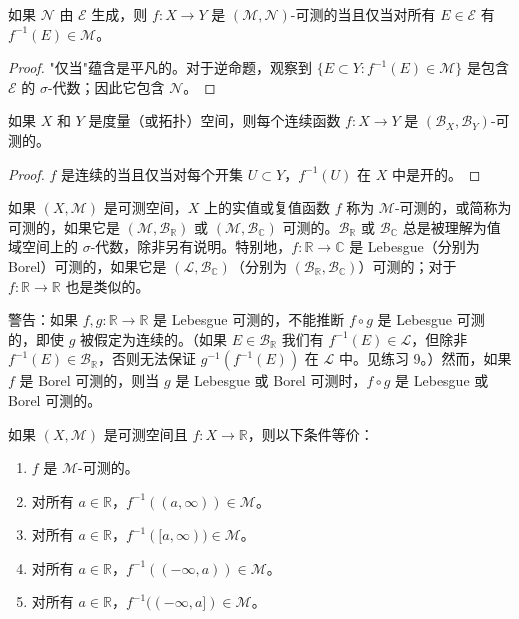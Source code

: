 \documentclass[lang=cn,10pt,thmcnt=section]{elegantbook}
\begin{document}
\begin{proposition}\label{proposition2.1}
如果 $\mathcal{N}$ 由 $\mathcal{E}$ 生成，则 $f : X \to Y$ 是 $(\mathcal{M},\mathcal{N})$-可测的当且仅当对所有 $E \in \mathcal{E}$ 有 $f^{-1}(E) \in \mathcal{M}$。
\end{proposition}

\begin{proof}
"仅当"蕴含是平凡的。对于逆命题，观察到 $\{E \subset Y : f^{-1}(E) \in \mathcal{M}\}$ 是包含 $\mathcal{E}$ 的 $\sigma$-代数；因此它包含 $\mathcal{N}$。
\end{proof}

\begin{corollary}\label{corollary2.2}
如果 $X$ 和 $Y$ 是度量（或拓扑）空间，则每个连续函数 $f : X \to Y$ 是 $(\mathcal{B}_X, \mathcal{B}_Y)$-可测的。
\end{corollary}

\begin{proof}
$f$ 是连续的当且仅当对每个开集 $U \subset Y$，$f^{-1}(U)$ 在 $X$ 中是开的。
\end{proof}

如果 $(X,\mathcal{M})$ 是可测空间，$X$ 上的实值或复值函数 $f$ 称为 $\mathcal{M}$-可测的，或简称为可测的，如果它是 $(\mathcal{M},\mathcal{B}_\mathbb{R})$ 或 $(\mathcal{M},\mathcal{B}_\mathbb{C})$ 可测的。$\mathcal{B}_\mathbb{R}$ 或 $\mathcal{B}_\mathbb{C}$ 总是被理解为值域空间上的 $\sigma$-代数，除非另有说明。特别地，$f : \mathbb{R} \to \mathbb{C}$ 是 Lebesgue（分别为 Borel）可测的，如果它是 $(\mathcal{L}, \mathcal{B}_\mathbb{C})$（分别为 $(\mathcal{B}_\mathbb{R}, \mathcal{B}_\mathbb{C})$）可测的；对于 $f : \mathbb{R} \to \mathbb{R}$ 也是类似的。

警告：如果 $f,g : \mathbb{R} \to \mathbb{R}$ 是 Lebesgue 可测的，不能推断 $f \circ g$ 是 Lebesgue 可测的，即使 $g$ 被假定为连续的。（如果 $E \in \mathcal{B}_\mathbb{R}$ 我们有 $f^{-1}(E) \in \mathcal{L}$，但除非 $f^{-1}(E) \in \mathcal{B}_\mathbb{R}$，否则无法保证 $g^{-1}(f^{-1}(E))$ 在 $\mathcal{L}$ 中。见练习 9。）然而，如果 $f$ 是 Borel 可测的，则当 $g$ 是 Lebesgue 或 Borel 可测时，$f \circ g$ 是 Lebesgue 或 Borel 可测的。

\begin{proposition}\label{proposition2.3}
如果 $(X,\mathcal{M})$ 是可测空间且 $f : X \to \mathbb{R}$，则以下条件等价：
\begin{enumerate}[label=\alph*.]
\item $f$ 是 $\mathcal{M}$-可测的。
\item 对所有 $a \in \mathbb{R}$，$f^{-1}((a,\infty)) \in \mathcal{M}$。
\item 对所有 $a \in \mathbb{R}$，$f^{-1}([a,\infty)) \in \mathcal{M}$。
\item 对所有 $a \in \mathbb{R}$，$f^{-1}((-\infty,a)) \in \mathcal{M}$。
\item 对所有 $a \in \mathbb{R}$，$f^{-1}((-\infty,a]) \in \mathcal{M}$。
\end{enumerate}
\end{proposition}
\end{document}
